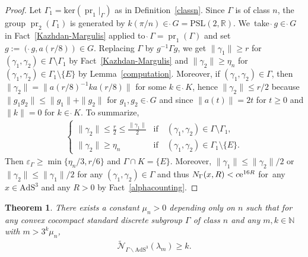 \documentclass[pdftex]{sigma}
\numberwithin{equation}{section}
\newtheorem{Theorem}{Theorem}[section]
\begin{document}
\begin{proof}
Let $\Gamma_1=\mathrm{ker}(\operatorname{pr}_{1}|_{\Gamma})$
as in Definition~\ref{classn}.
Since $\Gamma$ is of class $n$,
the group $\operatorname{pr}_{2}(\Gamma_{1})$ is generated by
$k(\pi/n)\in \grave{\ }G=\mathrm{PSL}(2,\mathbb{R})$. We~take $\grave{\ }g \in \grave{\ }G$ in Fact~\ref{Kazhdan-Margulis} applied
to $\grave{\ }\Gamma=\operatorname{pr}_{1}(\Gamma)$ and
set $g:=(\grave{\ }g,a(r/8))\in G$.
Replacing $\Gamma$ by $g^{-1}\Gamma g$, we get
$\|\gamma_{1}\|\geq r$ for
$(\gamma_{1},\gamma_{2})\in\Gamma\setminus\Gamma_{1}$
by Fact~\ref{Kazhdan-Margulis} and
$\|\gamma_{2}\|\geq \eta_n$ for $(\gamma_1,\gamma_2)\in\Gamma_1\setminus\{E\}$
by Lemma~\ref{computation}.
Moreover, if $(\gamma_{1},\gamma_{2})\in\Gamma$, then
$\|\gamma_{2}\|=\|a(r/8)^{-1}ka(r/8)\|$ for some $k\in\grave{\ }K$,
hence $\|\gamma_{2}\|\leq r/2$ because
$\|g_{1}g_{2}\|\leq\|g_{1}\|+\|g_{2}\|$ for $g_{1},g_{2} \in \grave{\ }G$
and since
$\|a(t)\|=2t$ for $t\geq 0$ and $\|k\|=0$ for $k\in\grave{\ }K$.
To summarize,
\begin{gather*}
\begin{cases}
\|\gamma_{2}\|\leq \frac{r}{2}\leq\frac{\|\gamma_{1}\|}{2} &
\text{if}\quad (\gamma_{1},\gamma_{2})\in\Gamma\setminus\Gamma_{1},
\\[1ex]
\|\gamma_{2}\|\geq \eta_n &
\text{if}\quad(\gamma_{1},\gamma_{2})\in\Gamma_{1}\setminus\{E\}.
\end{cases}
\end{gather*}
Then $\varepsilon_{\Gamma}\geq\operatorname{min}\{\eta_n/3,r/6\}$
and $\Gamma\cap K=\{E\}$.
Moreover, $\|\gamma_{1}\|\leq\|\gamma_{2}\|/2$ or
$\|\gamma_{2}\|\leq\|\gamma_{1}\|/2$ for any $(\gamma_{1},\gamma_{2})\in\Gamma$
and thus $N_{\Gamma}(x,R)<c{\rm e}^{16R}$
for~any~$x\in \mathrm{AdS}^{3}$ and any $R>0$
by Fact~\ref{alphacounting}.
\end{proof}

\begin{Theorem}
\label{standard}
There exists a constant $\mu_{n}>0$ depending only on $n$ such that
for any convex cocompact standard discrete subgroup $\Gamma$ of class $n$
and any $m,k\in\mathbb{N}$ with $m>3^k\mu_{n}$,
\begin{gather*}
\widetilde{\mathcal{N}}_{\Gamma\backslash\mathrm{AdS}^{3}}(\lambda_{m})\geq k.
\end{gather*}
\end{Theorem}
\end{document}
